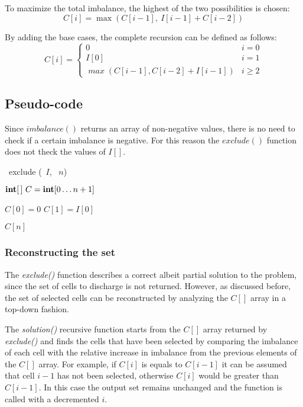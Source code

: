 To maximize the total imbalance, the highest of the two possibilities is chosen:
\[
    C[i]=\max(C[i-1],\ I[i-1] + C[i-2])
\]

By adding the base cases, the complete recursion can be defined as follows:
\[
    C[i] = \begin{cases}
        0                                      & i=0      \\
        I[0]                                   & i=1      \\
        \mathit{\max}(C[i-1], C[i-2] + I[i-1]) & i \geq 2
    \end{cases}
\]

\subsection{Pseudo-code}
Since $\mathit{imbalance()}$ returns an array of non-negative values, there is no need to check if a certain imbalance is negative. For this reason the $\mathit{exclude()}$ function does not theck the values of $I[]$.

\begin{algorithm}[H]
    \DontPrintSemicolon
    \NoCaptionOfAlgo
    \caption[exclude]{\INTEGER\ \textsf{exclude} (\INTARRAY\ $I$, \INTEGER\ $n$)}\label{algorithm:exclude}
    $\INTARRAY\ C = \INTEGER[0 \ldots n+1]$\;

    $C[0] = 0$\;
    $C[1] = I[0]$\;


    \Return $C[n]$\;
\end{algorithm}

\subsubsection{Reconstructing the set}
The \textit{exclude()} function describes a correct albeit partial solution to the problem, since the set of cells to discharge is not returned. However, as discussed before, the set of selected cells can be reconstructed by analyzing the $C[]$ array in a top-down fashion.

The \textit{solution()} recursive function starts from the $C[]$ array returned by \textit{exclude()} and finds the cells that have been selected by comparing the imbalance of each cell with the relative increase in imbalance from the previous elements of the $C[]$ array.
For example, if $C[i]$ is equals to $C[i-1]$ it can be assumed that cell $i-1$ has not been selected, otherwise $C[i]$ would be greater than $C[i-1]$. In this case the output set remains unchanged and the function is called with a decremented $i$.

